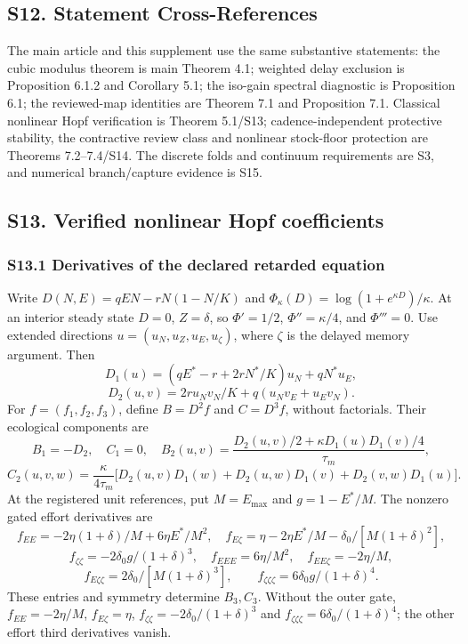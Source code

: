 \documentclass[
  10pt,
  a4paper,
]{article}
\begin{document}
\subsection{S12. Statement
Cross-References}\label{s12.-statement-cross-references}

The main article and this supplement use the same substantive
statements: the cubic modulus theorem is main Theorem 4.1; weighted
delay exclusion is Proposition 6.1.2 and Corollary 5.1; the iso-gain
spectral diagnostic is Proposition 6.1; the reviewed-map identities are
Theorem 7.1 and Proposition 7.1. Classical nonlinear Hopf verification
is Theorem 5.1/S13; cadence-independent protective stability, the
contractive review class and nonlinear stock-floor protection are
Theorems 7.2--7.4/S14. The discrete folds and continuum requirements are
S3, and numerical branch/capture evidence is S15.

\subsection{S13. Verified nonlinear Hopf
coefficients}\label{s13.-verified-nonlinear-hopf-coefficients}

\subsubsection{S13.1 Derivatives of the declared retarded
equation}\label{s13.1-derivatives-of-the-declared-retarded-equation}

Write \(D(N,E)=qEN-rN(1-N/K)\) and
\(\Phi_\kappa(D)=\log(1+e^{\kappa D})/\kappa\). At an interior steady
state \(D=0\), \(Z=\delta\), so \(\Phi'=1/2\), \(\Phi''=\kappa/4\), and
\(\Phi'''=0\). Use extended directions \(u=(u_N,u_Z,u_E,u_\zeta)\),
where \(\zeta\) is the delayed memory argument. Then
\[D_1(u)=(qE^*-r+2rN^*/K)u_N+qN^*u_E,\]
\[D_2(u,v)=2r u_Nv_N/K+q(u_Nv_E+u_Ev_N).\] For \(f=(f_1,f_2,f_3)\),
define \(B=D^2f\) and \(C=D^3f\), without factorials. Their ecological
components are
\[B_1=-D_2,\quad C_1=0,\quad B_2(u,v)=\frac{D_2(u,v)/2+\kappa D_1(u)D_1(v)/4}{\tau_m},\]
\[C_2(u,v,w)=\frac{\kappa}{4\tau_m}\big[D_2(u,v)D_1(w)+D_2(u,w)D_1(v)+D_2(v,w)D_1(u)\big].\]
At the registered unit references, put \(M=E_{\max}\) and \(g=1-E^*/M\).
The nonzero gated effort derivatives are
\[f_{EE}=-2\eta(1+\delta)/M+6\eta E^*/M^2,\quad f_{E\zeta}=\eta-2\eta E^*/M-\delta_0/[M(1+\delta)^2],\]
\[f_{\zeta\zeta}=-2\delta_0g/(1+\delta)^3,\quad f_{EEE}=6\eta/M^2,\quad f_{EE\zeta}=-2\eta/M,\]
\[f_{E\zeta\zeta}=2\delta_0/[M(1+\delta)^3],\qquad f_{\zeta\zeta\zeta}=6\delta_0g/(1+\delta)^4.\]
These entries and symmetry determine \(B_3,C_3\). Without the outer
gate, \(f_{EE}=-2\eta/M\), \(f_{E\zeta}=\eta\),
\(f_{\zeta\zeta}=-2\delta_0/(1+\delta)^3\) and
\(f_{\zeta\zeta\zeta}=6\delta_0/(1+\delta)^4\); the other effort third
derivatives vanish.
\end{document}
